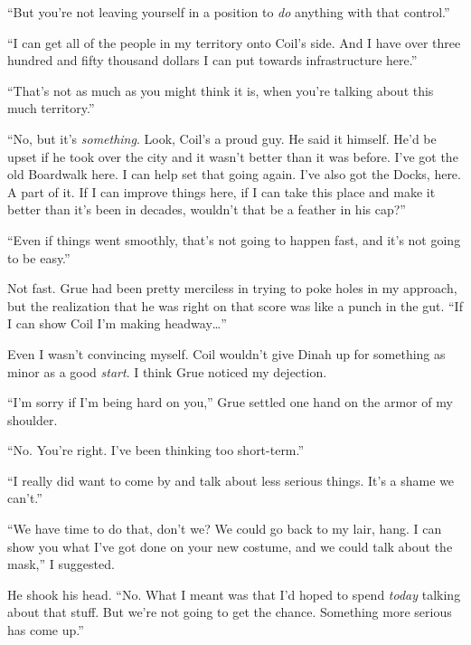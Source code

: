 ``But you're not leaving yourself in a position to \emph{do} anything with that control.''



``I can get all of the people in my territory onto Coil's side.  And I have over three hundred and fifty thousand dollars I can put towards infrastructure here.''



``That's not as much as you might think it is, when you're talking about this much territory.''



``No, but it's \emph{something}.  Look, Coil's a proud guy.  He said it himself.  He'd be upset if he took over the city and it wasn't better than it was before.  I've got the old Boardwalk here.  I can help set that going again.  I've also got the Docks, here.  A part of it.  If I can improve things here, if I can take this place and make it better than it's been in decades, wouldn't that be a feather in his cap?''



``Even if things went smoothly, that's not going to happen fast, and it's not going to be easy.''



Not fast.  Grue had been pretty merciless in trying to poke holes in my approach, but the realization that he was right on that score was like a punch in the gut.  ``If I can show Coil I'm making headway\ldots''



Even I wasn't convincing myself.  Coil wouldn't give Dinah up for something as minor as a good \emph{start}.  I think Grue noticed my dejection.



``I'm sorry if I'm being hard on you,'' Grue settled one hand on the armor of my shoulder.



``No.  You're right.  I've been thinking too short-term.''



``I really did want to come by and talk about less serious things.  It's a shame we can't.''



``We have time to do that, don't we?  We could go back to my lair, hang.  I can show you what I've got done on your new costume, and we could talk about the mask,'' I suggested.



He shook his head.  ``No.  What I meant was that I'd hoped to spend \emph{today} talking about that stuff.  But we're not going to get the chance.  Something more serious has come up.''



